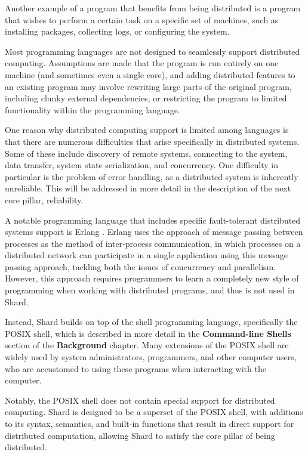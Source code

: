 \documentclass[oneside]{report}
\newcommand{\todoi}[1]{\todo[inline, color=blue!20]{TODO: {#1}}}
\begin{document}
Another example of a program that benefits from being distributed is a program that wishes to perform a certain task on a specific set of machines, such as installing packages, collecting logs, or configuring the system.

Most programming languages are not designed to seamlessly support distributed computing.
Assumptions are made that the program is run entirely on one machine (and sometimes even a single core), and adding distributed features to an existing program may involve rewriting large parts of the original program, including clunky external dependencies, or restricting the program to limited functionality within the programming language.

One reason why distributed computing support is limited among languages is that there are numerous difficulties that arise specifically in distributed systems. Some of these include discovery of remote systems, connecting to the system, data transfer, system state serialization, and concurrency.
One difficulty in particular is the problem of error handling, as a distributed system is inherently unreliable. This will be addressed in more detail in the description of the next core pillar, reliability.

A notable programming language that includes specific fault-tolerant distributed systems support is Erlang \cite{armstrong2010erlang}. Erlang uses the approach of message passing between processes as the method of inter-process communication, in which processes on a distributed network can participate in a single application using this message passing approach, tackling both the issues of concurrency and parallelism.
However, this approach requires programmers to learn a completely new style of programming when working with distributed programs, and thus is not used in Shard.


Instead, Shard builds on top of the shell programming language, specifically the POSIX shell, which is described in more detail in the \textbf{Command-line Shells} section of the \textbf{Background} chapter. Many extensions of the POSIX shell are widely used by system administrators, programmers, and other computer users, who are accustomed to using these programs when interacting with the computer.

Notably, the POSIX shell does not contain special support for distributed computing. Shard is designed to be a superset of the POSIX shell, with additions to its syntax, semantics, and built-in functions that result in direct support for distributed computation, allowing Shard to satisfy the core pillar of being distributed.
\end{document}

